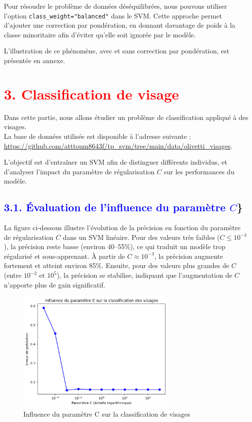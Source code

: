\documentclass[
  12pt,
]{article}
\begin{document}
Pour résoudre le problème de données déséquilibrées, nous pouvons
utiliser l'option \texttt{class\_weight="balanced"} dans le SVM. Cette
approche permet d'ajouter une correction par pondération, en donnant
davantage de poids à la classe minoritaire afin d'éviter qu'elle soit
ignorée par le modèle.

L'illustration de ce phénomène, avec et sans correction par pondération,
est présentée en annexe.

\section{\texorpdfstring{\textcolor{red}{3. Classification de visage}}{}}\label{section-5}

Dans cette partie, nous allons étudier un problème de classification
appliqué à des visages.\\
La base de données utilisée est disponible à l'adresse suivante :\\
\url{https://github.com/atttoum8643f/tp_svm/tree/main/data/olivetti_visages}.

L'objectif est d'entraîner un SVM afin de distinguer différents
individus, et d'analyser l'impact du paramètre de régularisation \(C\)
sur les performances du modèle.

\subsection{\texorpdfstring{\textcolor{blue}{3.1. Évaluation de l’influence du paramètre $C$}\}}{\}}}\label{section-6}

La figure ci-dessous illustre l'évolution de la précision en fonction du
paramètre de régularisation \(C\) dans un SVM linéaire. Pour des valeurs
très faibles (\(C \leq 10^{-4}\)), la précision reste basse (environ
40--55\%), ce qui traduit un modèle trop régularisé et sous-apprenant. À
partir de \(C \approx 10^{-3}\), la précision augmente fortement et
atteint environ 85\%. Ensuite, pour des valeurs plus grandes de \(C\)
(entre \(10^{-2}\) et \(10^{5}\)), la précision se stabilise, indiquant
que l'augmentation de \(C\) n'apporte plus de gain significatif.

\begin{figure}[H]
    \centering
    \includegraphics[width=0.7\textwidth]{vis/influence_c.png}
    \caption{Influence du paramètre C sur la classification de visages}
    \label{fig:influence_de_c}
\end{figure}
\end{document}
